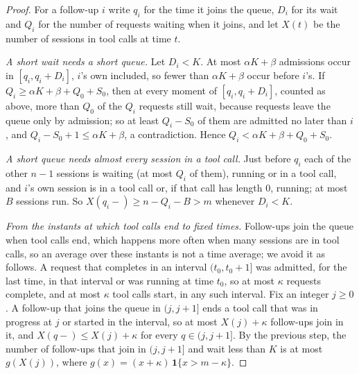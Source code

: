 \begin{proof}
For a follow-up $i$ write $q_i$ for the time it joins the queue, $D_i$ for its wait and $Q_i$ for the number of requests waiting when it joins, and let $X(t)$ be the number of sessions in tool calls at time $t$.

\emph{A short wait needs a short queue.} Let $D_i<K$. At most $\alpha K+\beta$ admissions occur in $[q_i,q_i+D_i]$, $i$'s own included, so fewer than $\alpha K+\beta$ occur before $i$'s. If $Q_i\ge\alpha K+\beta+Q_0+S_0$, then at every moment of $[q_i,q_i+D_i]$, counted as above, more than $Q_0$ of the $Q_i$ requests still wait, because requests leave the queue only by admission; so at least $Q_i-S_0$ of them are admitted no later than $i$, and $Q_i-S_0+1\le\alpha K+\beta$, a contradiction. Hence $Q_i<\alpha K+\beta+Q_0+S_0$.

\emph{A short queue needs almost every session in a tool call.} Just before $q_i$ each of the other $n-1$ sessions is waiting (at most $Q_i$ of them), running or in a tool call, and $i$'s own session is in a tool call or, if that call has length 0, running; at most $B$ sessions run. So $X(q_i-)\ge n-Q_i-B>m$ whenever $D_i<K$.

\emph{From the instants at which tool calls end to fixed times.} Follow-ups join the queue when tool calls end, which happens more often when many sessions are in tool calls, so an average over these instants is not a time average; we avoid it as follows. A request that completes in an interval $(t_0,t_0+1]$ was admitted, for the last time, in that interval or was running at time $t_0$, so at most $\kappa$ requests complete, and at most $\kappa$ tool calls start, in any such interval. Fix an integer $j\ge0$. A follow-up that joins the queue in $(j,j+1]$ ends a tool call that was in progress at $j$ or started in the interval, so at most $X(j)+\kappa$ follow-ups join in it, and $X(q-)\le X(j)+\kappa$ for every $q\in(j,j+1]$. By the previous step, the number of follow-ups that join in $(j,j+1]$ and wait less than $K$ is at most $g(X(j))$, where $g(x)=(x+\kappa)\,\mathbf 1\{x>m-\kappa\}$.


\end{proof}
